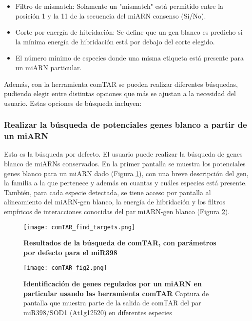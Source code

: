\begin{itemize}
    \item Filtro de mismatch: Solamente un "mismatch" está permitido entre la posición 1 y la 11 de la secuencia del miARN consenso (Sí/No).
    \item Corte por energía de hibridación: Se define que un gen blanco es predicho si la mínima energía de hibridación está por debajo del corte elegido.
    \item El número mínimo de especies donde una misma etiqueta está presente para un miARN particular.
\end{itemize}

Además, con la herramienta comTAR se pueden realizar diferentes búsquedas, pudiendo elegir entre distintas opciones que más se ajustan a la necesidad del usuario.
Estas opciones de búsqueda incluyen:

\subsubsection{Realizar la búsqueda de potenciales genes blanco a partir de un miARN}
Esta es la búsqueda por defecto.
El usuario puede realizar la búsqueda de genes blanco de miARNs conservados.
En la primer pantalla se muestra los potenciales genes blanco para un miARN dado (Figura \ref{fig:comTAR_find_targets}), con una breve descripción del gen, la familia a la que pertenece y además en cuantas y cuáles especies está presente.
También, para cada especie detectada, se tiene acceso por pantalla al alineamiento del miARN-gen blanco, la energía de hibridación y los filtros empíricos de interacciones conocidas del par miARN-gen blanco (Figura \ref{fig:comTAR_fig2}).

\begin{figure}[htbp!] 
    \centering    
    \texttt{[image: comTAR\_find\_targets.png]}
    \caption[Resultados del comTAR para el miR398]{
    \textbf{Resultados de la búsqueda de comTAR, con parámetros por defecto para el miR398}}
    \label{fig:comTAR_find_targets}
\end{figure}

\begin{figure}[htbp!] 
    \centering    
    \texttt{[image: comTAR\_fig2.png]}
    \caption[Identificación de genes regulados por un miARN en particular usando las herramienta comTAR]{
    \textbf{Identificación de genes regulados por un miARN en particular usando las herramienta comTAR}
    Captura de pantalla que muestra parte de la salida de comTAR del par miR398/SOD1 (At1g12520) en diferentes especies}
    \label{fig:comTAR_fig2}
\end{figure}

